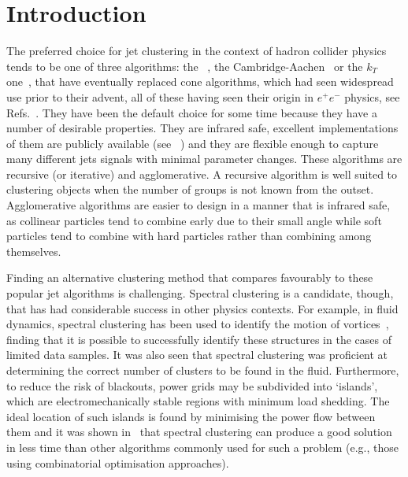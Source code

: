 \section{Introduction}\label{sec:JetClustering}

The preferred choice for jet clustering in the context of hadron collider physics tends to be one of three algorithms:  
the \antikt{}~\cite{Cacciari2008akt}, the Cambridge-Aachen~\cite{Dokshitzer:1997in,Wobisch1998caJet} or the $k_T$  one~\cite{Ellis1993ktJet}, that have  eventually replaced cone algorithms, which had seen widespread use prior to their advent, all of these having seen  their origin in $e^+e^-$ physics, see  Refs.~\cite{Sterman:1977wj,Bethke:1991wk,Catani:1991hj,Moretti:1998qx}.
They have been the default choice for some time because they have a number of desirable properties.
They are infrared safe, excellent implementations of them are publicly available (see \fastjet{}~\cite{Cacciari2011FastJet})
and they are flexible enough to capture many different jets signals with minimal parameter changes.
These algorithms are recursive (or iterative) and agglomerative.
A recursive algorithm is well suited to clustering objects when the number of groups is not known from the outset.
Agglomerative algorithms are easier to design in a manner that is infrared safe,
as collinear particles tend to combine early due to their small angle while
 soft particles tend to combine with hard particles rather than combining  among themselves.

Finding an alternative clustering method that compares favourably to these popular jet algorithms is challenging.
Spectral clustering is a candidate, though, that has had considerable success in other physics contexts.
For example, in fluid dynamics, spectral clustering has been used  to identify the motion
of vortices~\cite{hadjighasem2016votex}, finding that it is possible
to successfully identify these structures in the cases of limited data samples.
It was also seen that spectral clustering was proficient at determining the correct number
of clusters to be found in the fluid. Furthermore, to reduce the risk of blackouts, power grids may be subdivided into `islands', which are
electromechanically stable regions with minimum load shedding.
The ideal location of such islands  is found by minimising the power flow between them 
and it was shown in~\cite{fennelly2014power} that spectral clustering
can produce a good solution in less time than other algorithms commonly used for such a problem (e.g., those using combinatorial optimisation approaches).

